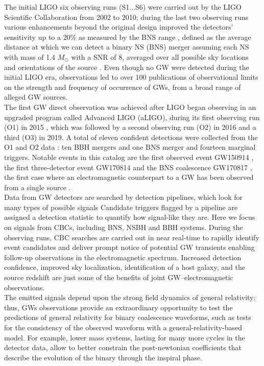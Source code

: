 \documentclass[binding=0.6cm, LaM]{sapthesis}
\begin{document}
	The initial LIGO six observing runs (S1...S6) were carried out 
	by the LIGO Scientific Collaboration from 2002 to 2010; 
	during the last two observing runs various enhancements 
	beyond the original design improved the detectors' sensitivity up to a $20\%$  
	as measured by the BNS range \cite{53,54},
	defined as the average distance at which we can detect a binary NS (BNS) merger
	assuming each NS with mass of 1.4 ${M_\odot}$ with a SNR of 8, 
	averaged over all possible sky locations and orientations of the source \cite{51}. 
	Even though no GW were detected during the initial LIGO era, 
	observations led to over 100 publications of observational limits 
	on the strength and frequency of occurrence of GWs, from a broad range of alleged GW sources. \\
	The first GW direct observation was achieved after LIGO began observing in an upgraded program called Advanced LIGO (aLIGO), 
	during its first observing run (O1) in 2015  \cite{52}, which was followed by a second observing run (O2) in 2016 and a third (O3) in 2019.
	A total of eleven confident detections were collected from the O1 and O2 data \cite{13}: 
	ten BBH mergers \cite{14, 52, 58-60} and one BNS merger \cite{61} and fourteen marginal triggers.
	Notable events in this catalog are the first observed event GW150914 \cite{52},
	the first three-detector event GW170814 \cite{60} and the BNS
	coalescence GW170817 \cite{61}, the first case where an electromagnetic counterpart to a GW 
	has been observed from a single source \cite{15}. \\
	Data from GW detectors are searched by detection pipelines, which look for many types of possible signals \cite{68}
	Candidate triggers flagged by a pipeline are assigned a detection statistic 
	to quantify how signal-like they are. 
	Here we focus on signals from CBCs, including BNS, NSBH and BBH systems.
	During the observing runs, CBC searches are carried out in near real-time 
	to rapidly identify event candidates and deliver prompt notice of potential GW transients 
	enabling follow-up observations in the electromagnetic spectrum. 
	Increased detection confidence, improved sky localization, identification of a host galaxy, 
	and the source redshift are just some of the benefits of joint GW–electromagnetic observations. \\
	The emitted signals depend upon the strong field dynamics of general relativity; 
	thus, GWs observations provide an extraordinary opportunity to test 
	the predictions of general relativity for binary coalescence waveforms, such as tests for the consistency of the observed waveform with a general-relativity-based model.
	For example, lower mass systems, lasting for many more cycles in the detector data, 
	allow to better constrain the post-newtonian coefficients that describe the evolution of the binary through the inspiral phase. 
\end{document}

